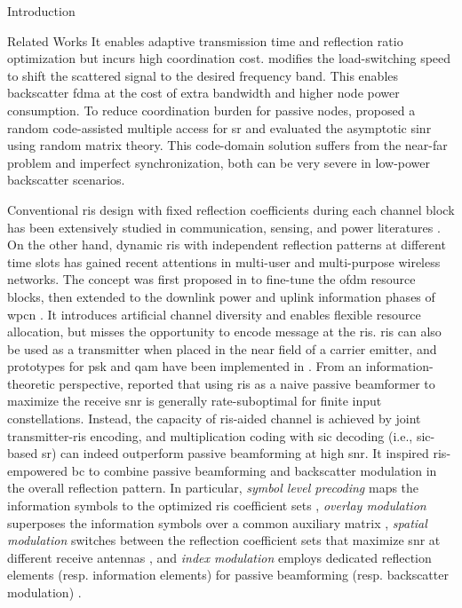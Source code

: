 \documentclass[journal]{IEEEtran}
\begin{document}
\begin{section}{Introduction}
\begin{subsection}{Related Works}
		It enables adaptive transmission time and reflection ratio optimization but incurs high coordination cost.
		\cite{Vougioukas2019} modifies the load-switching speed to shift the scattered signal to the desired frequency band.
		This enables backscatter \gls{fdma} at the cost of extra bandwidth and higher node power consumption.
		To reduce coordination burden for passive nodes, \cite{Han2021} proposed a random code-assisted multiple access for \gls{sr} and evaluated the asymptotic \gls{sinr} using random matrix theory.
		This code-domain solution suffers from the near-far problem and imperfect synchronization, both can be very severe in low-power backscatter scenarios.

		Conventional \gls{ris} design with fixed reflection coefficients during each channel block has been extensively studied in communication, sensing, and power literatures \cite{Wu2018,Zhang2019a,Lin2022,Liu2022,Feng2022,Zhao2022}.
		On the other hand, dynamic \gls{ris} with independent reflection patterns at different time slots has gained recent attentions in multi-user and multi-purpose wireless networks.
		The concept was first proposed in \cite{Yang2020} to fine-tune the \gls{ofdm} resource blocks, then extended to the downlink power and uplink information phases of \gls{wpcn} \cite{Wu2021,Wu2021d,Hua2022a}.
		It introduces artificial channel diversity and enables flexible resource allocation, but misses the opportunity to encode message at the \gls{ris}.
		\gls{ris} can also be used as a transmitter when placed in the near field of a carrier emitter, and prototypes for \gls{psk} and \gls{qam} have been implemented in \cite{Tang2019a,Dai2020a}.
		From an information-theoretic perspective, \cite{Karasik2020} reported that using \gls{ris} as a naive passive beamformer to maximize the receive \gls{snr} is generally rate-suboptimal for finite input constellations.
		Instead, the capacity of \gls{ris}-aided channel is achieved by joint transmitter-\gls{ris} encoding, and multiplication coding with \gls{sic} decoding (i.e., \gls{sic}-based \gls{sr}) can indeed outperform passive beamforming at high \gls{snr}.
		It inspired \gls{ris}-empowered \gls{bc} \cite{Liu2019d,Bereyhi2020,Xu2020b,Zhang2021d,Hu2021b,Hua2022,Basar2020,Ma2020a,Yuan2021,Hu2021a} to combine passive beamforming and backscatter modulation in the overall reflection pattern.
		In particular, \emph{symbol level precoding} maps the information symbols to the optimized \gls{ris} coefficient sets \cite{Liu2019d,Bereyhi2020}, \emph{overlay modulation} superposes the information symbols over a common auxiliary matrix \cite{Xu2020b,Zhang2021d,Hu2021b,Hua2022}, \emph{spatial modulation} switches between the reflection coefficient sets that maximize \gls{snr} at different receive antennas \cite{Basar2020,Ma2020a,Yuan2021}, and \emph{index modulation} employs dedicated reflection elements (resp. information elements) for passive beamforming (resp. backscatter modulation) \cite{Hu2021a}.

\end{subsection}
\end{section}
\end{document}
